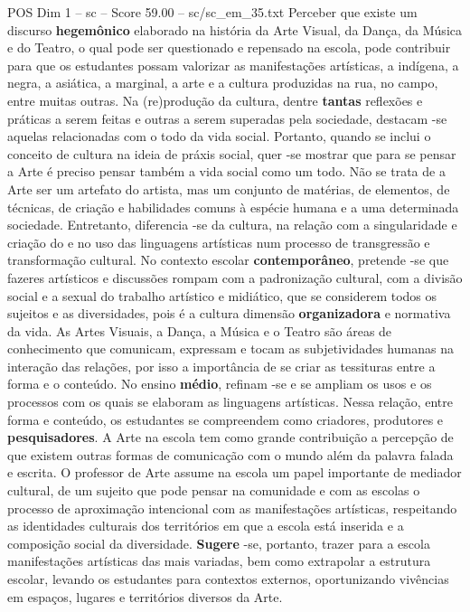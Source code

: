 \begin{textsample}{POS Dim 1 – sc – Score 59.00 – sc/sc\_em\_35.txt}
Perceber que existe um discurso \textbf{hegemônico} elaborado na história da Arte Visual, da Dança, da Música e do Teatro, o qual pode ser questionado e repensado na escola, pode contribuir para que os estudantes possam valorizar as manifestações artísticas, a indígena, a negra, a asiática, a marginal, a arte e a cultura produzidas na rua, no campo, entre muitas outras.
Na (re)produção da cultura, dentre \textbf{tantas} reflexões e práticas a serem feitas e outras a serem superadas pela sociedade, destacam -se aquelas relacionadas com o todo da vida social.
Portanto, quando se inclui o conceito de cultura na ideia de práxis social, quer -se mostrar que para se pensar a Arte é preciso pensar também a vida social como um todo.
Não se trata de a Arte ser um artefato do artista, mas um conjunto de matérias, de elementos, de técnicas, de criação e habilidades comuns à espécie humana e a uma determinada sociedade.
Entretanto, diferencia -se da cultura, na relação com a singularidade e criação do e no uso das linguagens artísticas num processo de transgressão e transformação cultural.
No contexto escolar \textbf{contemporâneo}, pretende -se que fazeres artísticos e discussões rompam com a padronização cultural, com a divisão social e a sexual do trabalho artístico e midiático, que se considerem todos os sujeitos e as diversidades, pois é a cultura dimensão \textbf{organizadora} e normativa da vida.
As Artes Visuais, a Dança, a Música e o Teatro são áreas de conhecimento que comunicam, expressam e tocam as subjetividades humanas na interação das relações, por isso a importância de se criar as tessituras entre a forma e o conteúdo.
No ensino \textbf{médio}, refinam -se e se ampliam os usos e os processos com os quais se elaboram as linguagens artísticas.
Nessa relação, entre forma e conteúdo, os estudantes se compreendem como criadores, produtores e \textbf{pesquisadores}.
A Arte na escola tem como grande contribuição a percepção de que existem outras formas de comunicação com o mundo além da palavra falada e escrita.
O professor de Arte assume na escola um papel importante de mediador cultural, de um sujeito que pode pensar na comunidade e com as escolas o processo de aproximação intencional com as manifestações artísticas, respeitando as identidades culturais dos territórios em que a escola está inserida e a composição social da diversidade. \textbf{Sugere} -se, portanto, trazer para a escola manifestações artísticas das mais variadas, bem como extrapolar a estrutura escolar, levando os estudantes para contextos externos, oportunizando vivências em espaços, lugares e territórios diversos da Arte.

\end{textsample}
